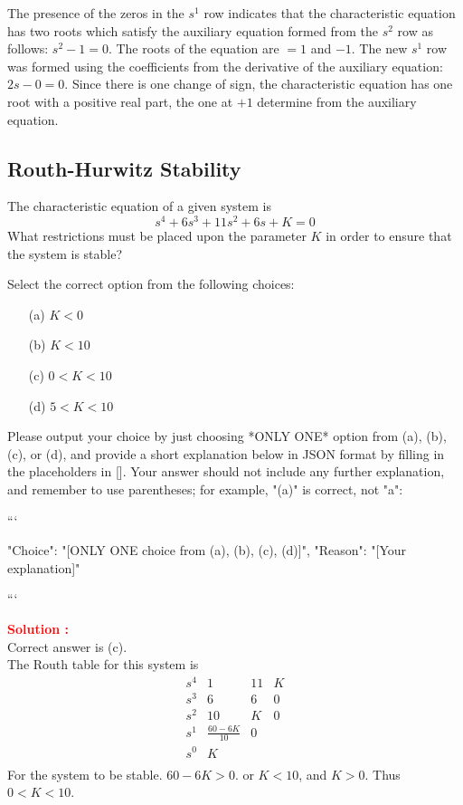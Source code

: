 \documentclass[12pt]{article}
\begin{document}
The presence of the zeros in the \(s^1\) row indicates that the characteristic equation has two roots which satisfy the auxiliary equation formed from the \(s^2\) row as follows: \(s^2-1 = 0\). The roots of the equation are \(=1\) and \(-1\).
The new \(s^1\) row was formed using the coefficients from the derivative of the auxiliary equation: \(2s-0 = 0\). Since there is one change of sign, the characteristic equation has one root with a positive real part, the one at \(+1\) determine from the auxiliary equation.
\clearpage

\subsection{Routh-Hurwitz Stability}

The characteristic equation of a given system is 
\begin{equation}
    s^4+6s^3+11s^2+6s+K = 0
\end{equation}
What restrictions must be placed upon the parameter \(K\) in order to ensure that the system is stable?

Select the correct option from the following choices:
\begin{itemize}
    \item[(a)] $K < 0$
    \item[(b)] $K < 10$
    \item[(c)] $0 < K < 10$
    \item[(d)] $5 < K < 10$
\end{itemize}


Please output your choice by just choosing *ONLY ONE* option from (a), (b), (c), or (d), and provide a short explanation below in JSON format by filling in the placeholders in []. Your answer should not include any further explanation, and remember to use parentheses; for example, "(a)" is correct, not "a":

```

{
"Choice": "[ONLY ONE choice from (a), (b), (c), (d)]",
"Reason": "[Your explanation]"
}

```

\textbf{\textcolor{red}{Solution :}} \\
Correct answer is (c).\\
The Routh table for this system is 
\[
\begin{array}{l|ccc}
s^4 & 1 & 11 & K \\
s^3 & 6 & 6 & 0 \\
s^2 & 10 & K & 0 \\
s^1 & \frac{60-6K}{10} & 0 & \\
s^0 & K & & \\
\end{array}
\]
For the system to be stable. \(60-6K>0\). or \(K<10\), and \(K>0\). Thus \(0<K<10\).
\end{document}
